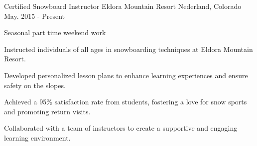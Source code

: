 \begin{cventries}
  \cventry
    {Certified Snowboard Instructor} %
    {Eldora Mountain Resort} %
    {Nederland, Colorado} %
    {May. 2015 - Present} %
    {
      \begin{cvitems} %
        \item {Seasonal part time weekend work}
        \item {Instructed individuals of all ages in snowboarding techniques at Eldora Mountain Resort.}  
        \item {Developed personalized lesson plans to enhance learning experiences and ensure safety on the slopes.}  
        \item {Achieved a 95\% satisfaction rate from students, fostering a love for snow sports and promoting return visits.}  
        \item {Collaborated with a team of instructors to create a supportive and engaging learning environment.}
      \end{cvitems}
    }

\end{cventries}
